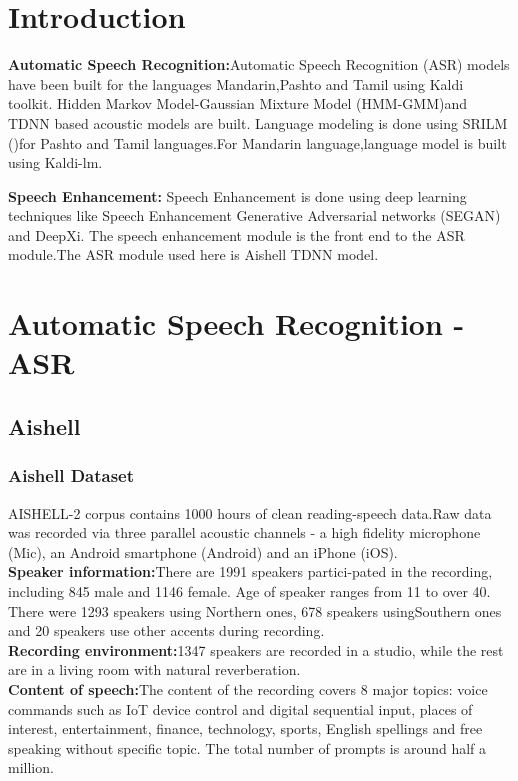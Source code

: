 \documentclass[12pt]{article}
\begin{document}
\listoftables
\newpage
\tableofcontents

\pagebreak
\section{Introduction}

\textbf{Automatic Speech Recognition:}Automatic Speech Recognition (ASR) models have been built for the languages Mandarin,Pashto and Tamil using Kaldi toolkit.
Hidden Markov Model-Gaussian Mixture Model (HMM-GMM)and TDNN based acoustic models are built.
Language modeling is done using SRILM ()for Pashto and Tamil languages.For Mandarin language,language model is built using Kaldi-lm.

\textbf{Speech Enhancement:} Speech Enhancement is done using deep learning techniques like Speech Enhancement Generative Adversarial networks (SEGAN) and DeepXi.
The speech enhancement module is the front end to the ASR module.The ASR module used here is Aishell TDNN model.

\section{Automatic Speech Recognition -ASR }
\subsection{Aishell}
\subsubsection{Aishell Dataset}
AISHELL-2 corpus contains 1000 hours of clean reading-speech data.Raw data was recorded via three parallel acoustic channels - a high fidelity microphone (Mic), an Android smartphone (Android) and an iPhone (iOS).\\ 

\textbf{Speaker information:}There are 1991 speakers partici-pated in the recording, including 845 male and 1146 female. Age of speaker ranges from 11 to over 40. There were 1293 speakers using Northern ones, 678 speakers usingSouthern ones and 20 speakers use other accents during recording.\\

\textbf{Recording environment:}1347 speakers are recorded in a studio, while the rest are in a living room with natural reverberation.\\

\textbf{Content of speech:}The content of the recording covers 8 major topics: voice commands such as IoT device control and digital sequential input, places of interest, entertainment, finance, technology, sports, English spellings and free speaking without specific topic. The total number of prompts is around half a million.\\
\newpage
\end{document}
